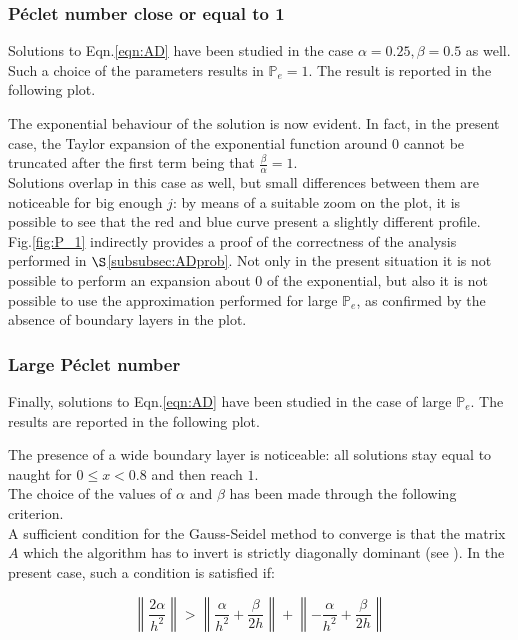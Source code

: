 \documentclass[11pt]{article}
\theoremstyle{theorem}
\theoremstyle{definition}
\begin{document}
\subsubsection{P\'{e}clet number close or equal to 1}
Solutions to Eqn.\eqref{eqn:AD} have been studied in the case $\alpha=0.25, \beta=0.5$ as well. Such a choice of the parameters results in $\mathbb{P}_e=1$. The result is reported in the following plot.

The exponential behaviour of the solution is now evident. In fact, in the present case, the Taylor expansion of the exponential function around 0 cannot be truncated after the first term being that $\frac{\beta}{\alpha}=1$.\\
Solutions overlap in this case as well, but small differences between them are noticeable for big enough $ j $: by means of a suitable zoom on the plot, it is possible to see that the red and blue curve present a slightly different profile.\\
Fig.\ref{fig:P_1} indirectly provides a proof of the correctness of the analysis performed in $\S$\ref{subsubsec:ADprob}. Not only in the present situation it is not possible to perform an expansion about $0$ of the exponential, but also it is not possible to use the approximation performed for large $\mathbb{P}_e$, as confirmed by the absence of boundary layers in the plot.\\

\subsubsection{Large P\'{e}clet number}
Finally, solutions to Eqn.\eqref{eqn:AD} have been studied in the case of large $\mathbb{P}_e$. The results are reported in the following plot.



The presence of a wide boundary layer is noticeable: all solutions stay equal to naught for $0\le x < 0.8$ and then reach $1$.\\

The choice of the values of $\alpha$ and $\beta$ has been made through the following criterion.\\
A sufficient condition for the Gauss-Seidel method to converge is that the matrix $A$ which the algorithm has to invert is strictly diagonally dominant (see \cite{numerical-math}). In the present case, such a condition is satisfied if:

$$\left\|\frac{2\alpha}{h^2}\right\|> \left\|\frac{\alpha}{h^2}+\frac{\beta}{2h}\right\| + \left\|-\frac{\alpha}{h^2}+\frac{\beta}{2h}\right\|$$
\end{document}

